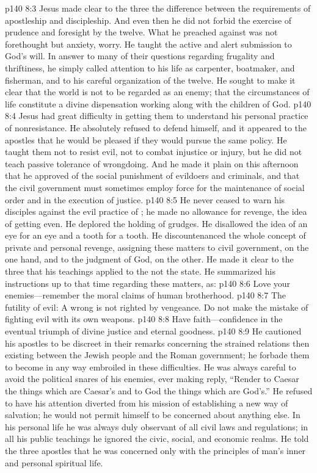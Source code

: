 \vs p140 8:3 Jesus made clear to the three the difference between the requirements of apostleship and discipleship. And even then he did not forbid the exercise of prudence and foresight by the twelve. What he preached against was not forethought but anxiety, worry. He taught the active and alert submission to God’s will. In answer to many of their questions regarding frugality and thriftiness, he simply called attention to his life as carpenter, boatmaker, and fisherman, and to his careful organization of the twelve. He sought to make it clear that the world is not to be regarded as an enemy; that the circumstances of life constitute a divine dispensation working along with the children of God.
\vs p140 8:4 Jesus had great difficulty in getting them to understand his personal practice of nonresistance. He absolutely refused to defend himself, and it appeared to the apostles that he would be pleased if they would pursue the same policy. He taught them not to resist evil, not to combat injustice or injury, but he did not teach passive tolerance of wrongdoing. And he made it plain on this afternoon that he approved of the social punishment of evildoers and criminals, and that the civil government must sometimes employ force for the maintenance of social order and in the execution of justice.
\vs p140 8:5 He never ceased to warn his disciples against the evil practice of ; he made no allowance for revenge, the idea of getting even. He deplored the holding of grudges. He disallowed the idea of an eye for an eye and a tooth for a tooth. He discountenanced the whole concept of private and personal revenge, assigning these matters to civil government, on the one hand, and to the judgment of God, on the other. He made it clear to the three that his teachings applied to the  not the state. He summarized his instructions up to that time regarding these matters, as:
\vs p140 8:6 Love your enemies---remember the moral claims of human brotherhood.
\vs p140 8:7 The futility of evil: A wrong is not righted by vengeance. Do not make the mistake of fighting evil with its own weapons.
\vs p140 8:8 Have faith---confidence in the eventual triumph of divine justice and eternal goodness.
\pc \vs p140 8:9 \bibnobreakspace {} He cautioned his apostles to be discreet in their remarks concerning the strained relations then existing between the Jewish people and the Roman government; he forbade them to become in any way embroiled in these difficulties. He was always careful to avoid the political snares of his enemies, ever making reply, \textcolor{ubdarkred}{“Render to Caesar the things which are Caesar’s and to God the things which are God’s.”} He refused to have his attention diverted from his mission of establishing a new way of salvation; he would not permit himself to be concerned about anything else. In his personal life he was always duly observant of all civil laws and regulations; in all his public teachings he ignored the civic, social, and economic realms. He told the three apostles that he was concerned only with the principles of man’s inner and personal spiritual life.
